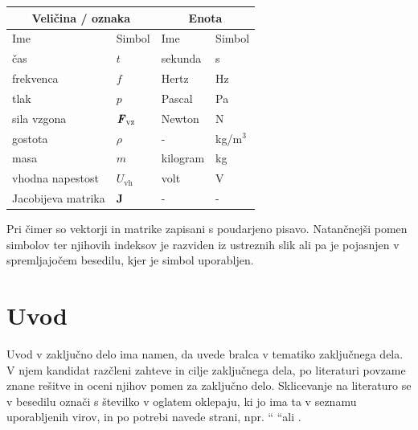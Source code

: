\documentclass[a4paper,twoside,openright,12pt,slovene]{book}
\begin{document}
\begin{center}
    \begin{tabular}{*{4}{l}} \hline
        \multicolumn{2}{c}{\bf{Veličina / oznaka}}           & \multicolumn{2}{c}{\bf{Enota}} \\ \hline
        Ime                & Simbol                          & Ime      & Simbol              \\ \hline
        čas                & $t$                             & sekunda  & s                   \\
        frekvenca          & $f$                             & Hertz    & Hz                  \\
        tlak               & $p$                             & Pascal   & Pa                  \\
        sila vzgona        & $\textbf{\textit{F}}_\text{vz}$ & Newton   & N                   \\
        gostota            & $\rho$                          & -        & kg/m$^3$            \\
        masa               & $m$                             & kilogram & kg                  \\
        vhodna napestost   & $U_\text{vh}$                   & volt     & V                   \\
        Jacobijeva matrika & $\mathbf{J}$                    & -        & -                   \\ \hline
    \end{tabular}
\end{center}

Pri čimer so vektorji in matrike zapisani s poudarjeno pisavo. Natančnejši pomen simbolov ter njihovih indeksov je razviden iz ustreznih slik ali pa je pojasnjen v spremljajočem besedilu, kjer je simbol uporabljen.

\mainmatter

\chapter{Uvod} \label{uvod}

Uvod v zaključno delo ima namen, da uvede bralca v tematiko zaključnega dela. V njem kandidat razčleni zahteve in cilje zaključnega dela, po literaturi povzame znane rešitve in oceni njihov pomen za zaključno delo. Sklicevanje na literaturo se v besedilu označi s številko v oglatem oklepaju, ki jo ima ta v seznamu uporabljenih virov, in po potrebi navede strani, npr. ``\cite{miklavcic2010objavljanje} ``ali \cite[stran 520-534]{juznic1992diplomska}.
\end{document}
